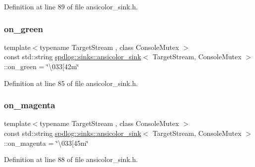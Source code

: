 Definition at line 89 of file ansicolor\+\_\+sink.\+h.

\mbox{\label{classspdlog_1_1sinks_1_1ansicolor__sink_addc3addb0060ca767421a4a3149c4747}} 
\subsubsection{\texorpdfstring{on\+\_\+green}{on\_green}}
{\footnotesize\ttfamily template$<$typename Target\+Stream , class Console\+Mutex $>$ \\
const std\+::string \hyperlink{classspdlog_1_1sinks_1_1ansicolor__sink}{spdlog\+::sinks\+::ansicolor\+\_\+sink}$<$ Target\+Stream, Console\+Mutex $>$\+::on\+\_\+green = \char`\"{}\textbackslash{}033\mbox{[}42m\char`\"{}}



Definition at line 85 of file ansicolor\+\_\+sink.\+h.

\mbox{\label{classspdlog_1_1sinks_1_1ansicolor__sink_a0cf149033d141e033f2ffb4b239f84f6}} 
\subsubsection{\texorpdfstring{on\+\_\+magenta}{on\_magenta}}
{\footnotesize\ttfamily template$<$typename Target\+Stream , class Console\+Mutex $>$ \\
const std\+::string \hyperlink{classspdlog_1_1sinks_1_1ansicolor__sink}{spdlog\+::sinks\+::ansicolor\+\_\+sink}$<$ Target\+Stream, Console\+Mutex $>$\+::on\+\_\+magenta = \char`\"{}\textbackslash{}033\mbox{[}45m\char`\"{}}



Definition at line 88 of file ansicolor\+\_\+sink.\+h.

\mbox{\label{classspdlog_1_1sinks_1_1ansicolor__sink_aa66893db05fcfebc131c66b7db30ea49}} 
